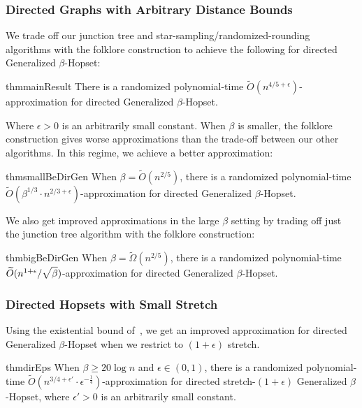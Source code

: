 \documentclass{article}
\theoremstyle{definition}
\theoremstyle{remark}
\def\be    {\beta}
\def\hopset {{\sc Generalized $\beta$-Hopset}}
\begin{document}
\subsubsection{Directed Graphs with Arbitrary Distance Bounds}
We trade off our junction tree and star-sampling/randomized-rounding algorithms with the folklore construction to achieve the following for directed {\hopset}:
\begin{restatable}{thm}{mainResult}
\label{thm:main_result}
    There is a randomized  polynomial-time $\widetilde{O}(n^{4/5 + \epsilon})$-approximation for directed {\hopset}.
\end{restatable}

Where $\epsilon > 0$ is an arbitrarily small constant. When $\beta$ is smaller, the folklore construction gives worse approximations than the trade-off between our other algorithms. In this regime, we achieve a better approximation:
\begin{restatable}{thm}{smallBeDirGen} \label{thm:small_be_dir_gen}
    When $\be = \widetilde{O}(n^{2/5})$, there is a randomized polynomial-time $\widetilde{O}(\be^{1/3} \cdot n^{2/3 + \epsilon})$-approximation for directed {\hopset}.
\end{restatable}
 
We also get improved approximations in the large $\beta$ setting by trading off just the junction tree algorithm with the folklore construction:
\begin{restatable}{thm}{bigBeDirGen} \label{thm:big_be_dir_gen}
    When $\be = \widetilde{\Omega}(n^{2/5})$, there is a randomized polynomial-time $\widetilde{O}( n^{1+\epsilon} / \sqrt{\vphantom{\be^k} \be})$-approximation for directed {\hopset}.
\end{restatable}


\subsubsection{Directed Hopsets with Small Stretch}
Using the existential bound of~\cite{BW23}, we get an improved approximation for directed {\hopset} when we restrict to $(1+\epsilon)$ stretch. 
\begin{restatable}{thm}{dirEps} \label{thm:dir_eps}
    When $\beta \geq 20\log n$ and $\epsilon \in (0,1)$, there is a randomized polynomial-time $\widetilde{O}(n^{3/4 + \epsilon'} \cdot \epsilon^{-\frac{1}{4}})$-approximation for directed stretch-$(1+\epsilon)$ {\hopset}, where $\epsilon' > 0$ is an arbitrarily small constant.
\end{restatable}
\end{document}
